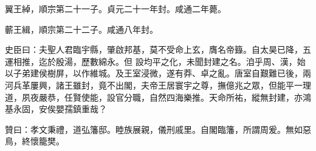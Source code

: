 \begin{pinyinscope}
 翼王綽，順宗第二十一子。貞元二十一年封。咸通二年薨。



 蘄王緝，順宗第二十二子。咸通八年封。



 史臣曰：夫聖人君臨宇縣，肇啟邦基，莫不受命上玄，膺名帝籙。自太昊已降，五運相推，迄於殷湯，歷數綿永。但
 設均平之化，未聞封建之名。洎乎周、漢，始以子弟建侯樹屏，以作維城。及王室浸微，遂有莽、卓之亂。唐室自艱難已後，兩河兵革屢興，諸王雖封，竟不出閣，夫帝王居寰宇之尊，撫億兆之眾，但能平一理道，夙夜嚴恭，任賢使能，設官分職，自然四海樂推。天命所祐，縱無封建，亦鴻基永固，安俟嬰孺鎮重哉？



 贊曰：孝文秉禮，道弘籓邸。睦族展親，儀刑戚里。自閣臨籓，所謂周爰。無如惡鳥，終懷籠樊。



\end{pinyinscope}